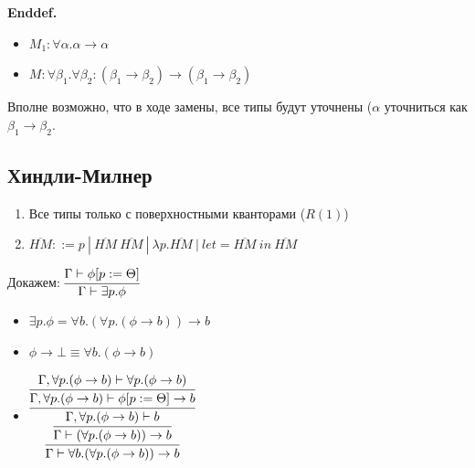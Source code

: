 \documentclass[12pt]{article}
\begin{document}
\noindent\textbf{Enddef.} 

\begin{paracol}{2}
\begin{itemize}[label={}]
    \item $M_1 : \forall \alpha . \alpha \rightarrow \alpha$
    \item $M : \forall \beta_1.\forall \beta_2: (\beta_1 \rightarrow \beta_2) \rightarrow (\beta_1 \rightarrow \beta_2)$
\end{itemize}
\switchcolumn
Вполне возможно, что в ходе замены, все типы будут уточнены ($\alpha$ уточниться как $\beta_1 \rightarrow \beta_2$.
\end{paracol}





\subsection{Хиндли-Милнер}

\begin{enumerate}
    \item Все типы только с поверхностными кванторами ($R(1)$)
    \item $\overline{HM} ::= p\ |\ \overline{HM}\ \overline{HM}\ |\ \lambda p. \overline{HM}\ |\ let =  \overline{HM}\ in\ \overline{HM}$
\end{enumerate}

Докажем: $\vcenter{\infer{\Gamma \vdash \exists p.\phi}{\Gamma \vdash \phi[p := \Theta]}}$
\begin{itemize}
    \item $\exists p.\phi = \forall b.(\forall p. (\phi \rightarrow b)) \rightarrow b$
    \item $\phi \rightarrow \bot \equiv \forall b. (\phi \rightarrow b)$
    
    \item $\vcenter{\infer[]{\Gamma \vdash \forall b.(\forall p.(\phi \rightarrow b)) \rightarrow b}{\infer{\Gamma \vdash (\forall p. (\phi \rightarrow b)) \rightarrow b}{\infer{\Gamma, \forall p. (\phi \rightarrow b) \vdash b}{\infer{\Gamma, \forall p. (\phi \rightarrow b) \vdash \phi [p := \Theta] \rightarrow b}{\Gamma, \forall p. (\phi \rightarrow b) \vdash \forall p.(\phi \rightarrow b)}}}}}$
\end{itemize}
\end{document}
